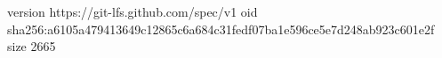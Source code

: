 version https://git-lfs.github.com/spec/v1
oid sha256:a6105a479413649c12865c6a684c31fedf07ba1e596ce5e7d248ab923c601e2f
size 2665
